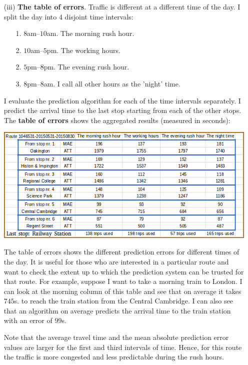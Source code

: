 \documentclass[12pt,a4paper,oneside,openright]{report}
\begin{document}
\begin{enumerate}

\item[(iii)] \textbf{The table of errors}. Traffic is different at a different time of
the day. I split the day into 4 disjoint time intervals:

\begin{enumerate}
\item[1.] $8$am--$10$am. The morning rush hour.
\item[2.] $10$am--$5$pm. The working hours.
\item[2.] $5$pm--$8$pm. The evening rush hour.
\item[3.] $8$pm--$8$am. I call all other hours as the 'night' time.



\end{enumerate}

I evaluate the prediction algorithm for each of the time intervals separately. I predict the
arrival time to the last stop starting from each of the other stops. The 
\textbf{table of errors} shows the aggregated results (measured in seconds):

\includegraphics[width=\textwidth]{figs/table_of_times.png}

The table of errors shows the different prediction errors for different
times of the day. It is useful for those who are interested in a
particular route and want to check the extent up to which the prediction system 
can be trusted for that route. For example, suppose I want to take a morning train
to London. I can look at the morning column of this table and see that on average
it takes $745$s. to reach the train station from the Central Cambridge. I can
also see that an algorithm on average predicts the arrival time to the train station
with an error of $99$s.

Note that the average travel time and the mean absolute
prediction error values are larger for the first and third intervals of time.
Hence, for this route the traffic is more congested and less predictable
during the rush hours.

\end{enumerate}
\end{document}
